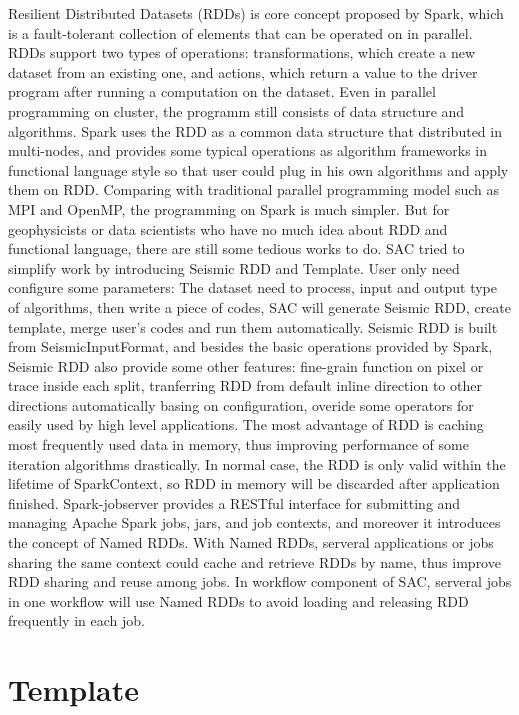 Resilient Distributed Datasets (RDDs) \cite{SparkRDD} is core concept proposed by Spark, which is a fault-tolerant collection of elements that can be operated on in parallel. RDDs \cite{ApacheSparkPG} support two types of operations: transformations, which create a new dataset from an existing one, and actions, which return a value to the driver program after running a computation on the dataset. Even in parallel programming on cluster, the programm still consists of data structure and algorithms. Spark uses the RDD as a common data structure that distributed in multi-nodes, and provides some typical operations as algorithm frameworks in functional language style so that user could plug in his own algorithms and apply them on RDD. Comparing with traditional parallel programming model such as MPI and OpenMP, the programming on Spark is much simpler. But for geophysicists or data scientists who have no much idea about RDD and functional language, there are still some tedious works to do. SAC tried to simplify work by introducing Seismic RDD and Template. User only need configure some parameters: The dataset need to process, input and output type of algorithms, then write a piece of codes, SAC will generate Seismic RDD, create template, merge user's codes and run them automatically. Seismic RDD is built from SeismicInputFormat, and besides the basic operations provided by Spark, Seismic RDD also provide some other features: fine-grain function on pixel or trace inside each split, tranferring RDD from default inline direction to other directions automatically basing on configuration, overide some operators for easily used by high level applications. The most advantage of RDD is caching most frequently used data in memory, thus improving performance of some iteration algorithms drastically. In normal case, the RDD is only valid within the lifetime of SparkContext, so RDD in memory will be discarded after application finished. Spark-jobserver \cite{SparkJobserver} provides a RESTful interface for submitting and managing Apache Spark jobs, jars, and job contexts, and moreover it introduces the concept of Named RDDs. With Named RDDs, serveral applications or jobs sharing the same context could cache and retrieve RDDs by name, thus improve RDD sharing and reuse among jobs. In workflow component of SAC, serveral jobs in one workflow will use Named RDDs to avoid loading and releasing RDD frequently in each job.

\section{Template}

